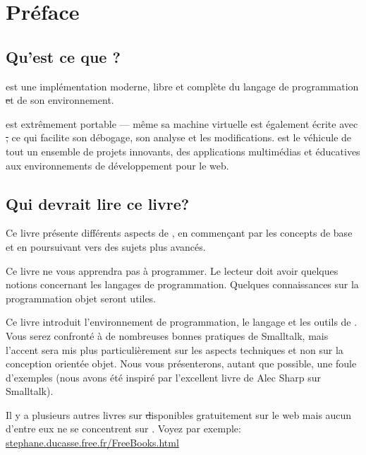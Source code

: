\documentclass[a4paper,10pt,twoside]{book}
\begin{document}
\fi
\renewcommand{\nnbb}[2]{} %
\sloppy
\chapter{Pr\'eface}\label{cha:intro}

\section*{Qu'est ce que \sq?}

\sq est une impl\'ementation moderne, libre et compl\`ete du langage de programmation \st et de son environnement.

\sq est extr\^emement portable --- m\^eme sa machine virtuelle est \'egalement \'ecrite avec \st, ce qui facilite son d\'ebogage, son analyse et les modifications. \sq est le v\'ehicule de tout un ensemble de projets innovants, des applications multim\'edias et \'educatives aux environnements de d\'eveloppement pour le web.

\section*{Qui devrait lire ce livre?}

Ce livre pr\'esente diff\'erents aspects de \sq, en commen\c{c}ant par les concepts de base et en poursuivant vers des sujets plus avanc\'es.

Ce livre ne vous apprendra pas \`a programmer. Le lecteur doit avoir quelques notions concernant les langages de programmation. Quelques connaissances sur la programmation objet seront utiles.

Ce livre introduit l'environnement de programmation, le langage et
les outils de \sq. Vous serez confront\'e \`a de nombreuses bonnes
pratiques de Smalltalk, mais l'accent sera mis plus particuli\`erement
sur les aspects techniques et non sur la conception orient\'ee
objet. Nous vous pr\'esenterons, autant que possible, une foule 
d'exemples (nous avons \'et\'e inspir\'e par l'excellent livre de Alec
Sharp sur Smalltalk\cite{Shar97a}).

Il y a plusieurs autres livres sur \st disponibles gratuitement sur le web mais aucun d'entre eux ne se concentrent sur \sq. Voyez par exemple:
\url{stephane.ducasse.free.fr/FreeBooks.html}
\end{document}
